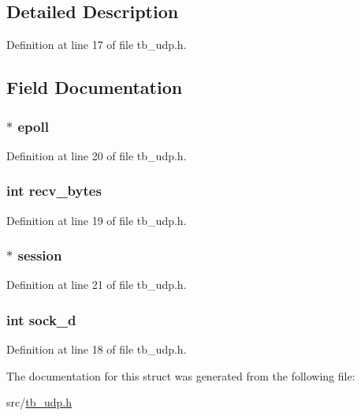 \subsection{Detailed Description}


Definition at line 17 of file tb\-\_\-udp.\-h.



\subsection{Field Documentation}
\hypertarget{structtb__udp__t_af7fbbda1b15f6051fb8cead0ada5ce7e}{
\subsubsection[{epoll}]{$\ast$ epoll}}\label{structtb__udp__t_af7fbbda1b15f6051fb8cead0ada5ce7e}


Definition at line 20 of file tb\-\_\-udp.\-h.

\hypertarget{structtb__udp__t_a720ac7ed925c17069fe94e7f7eab288b}{
\subsubsection[{recv\-\_\-bytes}]{\setlength{\rightskip}{0pt plus 5cm}int recv\-\_\-bytes}}\label{structtb__udp__t_a720ac7ed925c17069fe94e7f7eab288b}


Definition at line 19 of file tb\-\_\-udp.\-h.

\hypertarget{structtb__udp__t_af440bad4df83b8ff6504e90aa16ebc4c}{
\subsubsection[{session}]{$\ast$ session}}\label{structtb__udp__t_af440bad4df83b8ff6504e90aa16ebc4c}


Definition at line 21 of file tb\-\_\-udp.\-h.

\hypertarget{structtb__udp__t_a94d540b145f21be2f9b28a2c225ccf30}{
\subsubsection[{sock\-\_\-d}]{\setlength{\rightskip}{0pt plus 5cm}int sock\-\_\-d}}\label{structtb__udp__t_a94d540b145f21be2f9b28a2c225ccf30}


Definition at line 18 of file tb\-\_\-udp.\-h.



The documentation for this struct was generated from the following file\-:\begin{DoxyCompactItemize}
\item 
src/\hyperlink{tb__udp_8h}{tb\-\_\-udp.\-h}\end{DoxyCompactItemize}
